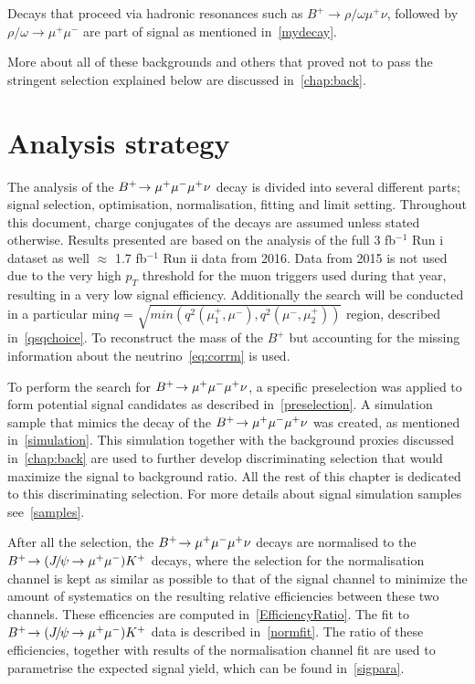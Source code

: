 Decays that proceed via hadronic resonances such as $B^{+} \rightarrow \rho/\omega \mu^{+} \nu$, followed by $\rho/\omega \rightarrow \mu^{+} \mu^{-}$ are part of signal as mentioned in~\autoref{mydecay}.

More about all of these backgrounds and others that proved not to pass the stringent selection explained below are discussed in~\autoref{chap:back}.

\section{Analysis strategy}
\label{Strategy}

The analysis of the ${{{B}^+}}\!\rightarrow {\ensuremath{\mu^+\mu^-\mu^+}}\nu$ decay is divided into several different parts; signal selection, optimisation, normalisation, fitting and limit setting. Throughout this document, charge conjugates of the decays are assumed unless stated otherwise. Results presented are based on the analysis of the full 3 fb$^{-1}$ Run \Rn{1} dataset as well $\approx$ 1.7 fb$^{-1}$ Run \Rn{2} data from 2016. Data from 2015 is not used due to the very high $p_{T}$ threshold for the muon triggers used during that year, resulting in a very low signal efficiency. Additionally the search will be conducted in a particular min$q$ = $\sqrt{min(q^{2}(\mu_{1}^{+},\mu^{-}), q^2(\mu^{-},\mu_{2}^{+}))}$ region, described in~\autoref{qsqchoice}. To reconstruct the mass of the $B^{+}$ but accounting for the missing information about the neutrino~\autoref{eq:corrm} is used. 


To perform the search for ${{{B}^+}}\!\rightarrow {\ensuremath{\mu^+\mu^-\mu^+}}\nu$, a specific preselection was applied to form potential signal candidates as described in~\autoref{preselection}. A simulation sample that mimics the decay of the ${{{B}^+}}\!\rightarrow {\ensuremath{\mu^+\mu^-\mu^+}}\nu$ was created, as mentioned in~\autoref{simulation}. This simulation together with the background proxies discussed in~\autoref{chap:back} are used to further develop discriminating selection that would maximize the signal to background ratio. All the rest of this chapter is dedicated to this discriminating selection. For more details about signal simulation samples see~\autoref{samples}.


After all the selection, the ${{{B}^+}}\!\rightarrow {\ensuremath{\mu^+\mu^-\mu^+}}\nu$ decays are normalised to the ${{{B}^+}}\!\rightarrow ({{J\mskip -3mu/\mskip -2mu\psi\mskip 2mu}}\!\rightarrow {\ensuremath{\mu^+\mu^-}}){{K}^+}$ decays, where the selection for the normalisation channel is kept as similar as possible to that of the signal channel to minimize the amount of systematics on the resulting relative efficiencies between these two channels. These efficencies are computed in~\autoref{EfficiencyRatio}. The fit to ${{{B}^+}}\!\rightarrow ({{J\mskip -3mu/\mskip -2mu\psi\mskip 2mu}}\!\rightarrow {\ensuremath{\mu^+\mu^-}}){{K}^+}$ data is described in~\autoref{normfit}. The ratio of these efficiencies, together with results of the normalisation channel fit are used to parametrise the expected signal yield, which can be found in~\autoref{sigpara}.




